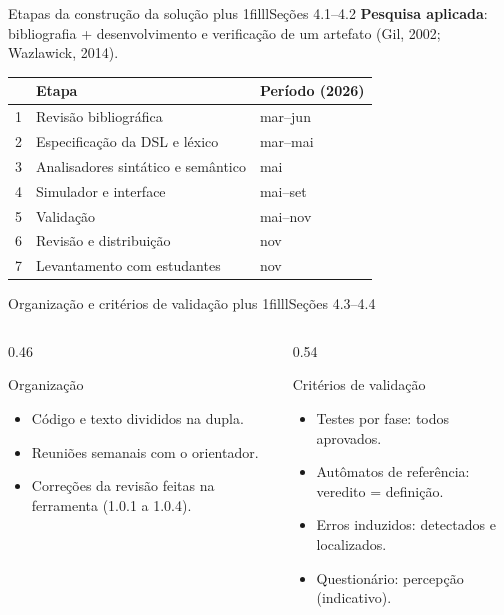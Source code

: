 \documentclass[aspectratio=169,12pt]{beamer}
\newcommand{\notexto}[1]{\hskip 0pt plus 1filll{\normalfont\small\color{white!85!acento}#1}}
\begin{document}
\begin{frame}{Etapas da construção da solução\notexto{Seções 4.1--4.2}}
  \textbf{Pesquisa aplicada}: bibliografia + desenvolvimento e verificação de um artefato
  (Gil, 2002; Wazlawick, 2014).
  \vspace{4pt}
  \begin{center}
    \renewcommand{\arraystretch}{1.05}
    \begin{tabular}{@{}rll@{}}
      \toprule
      & \textbf{Etapa} & \textbf{Período (2026)} \\
      \midrule
      1 & Revisão bibliográfica             & mar--jun \\
      2 & Especificação da DSL e léxico     & mar--mai \\
      3 & Analisadores sintático e semântico & mai \\
      4 & Simulador e interface             & mai--set \\
      5 & Validação                         & mai--nov \\
      6 & Revisão e distribuição            & nov \\
      7 & Levantamento com estudantes       & nov \\
      \bottomrule
    \end{tabular}
  \end{center}
\end{frame}

\begin{frame}{Organização e critérios de validação\notexto{Seções 4.3--4.4}}
  \begin{columns}[T]
    \begin{column}{0.46\textwidth}
      \begin{block}{Organização}
        \begin{itemize}
          \item Código e texto divididos na dupla.
          \item Reuniões semanais com o orientador.
          \item Correções da revisão feitas na ferramenta (1.0.1 a 1.0.4).
        \end{itemize}
      \end{block}
    \end{column}
    \begin{column}{0.54\textwidth}
      \begin{block}{Critérios de validação}
        \begin{itemize}
          \item Testes por fase: todos aprovados.
          \item Autômatos de referência: veredito = definição.
          \item Erros induzidos: detectados e localizados.
          \item Questionário: percepção (indicativo).
        \end{itemize}
      \end{block}
    \end{column}
  \end{columns}
\end{frame}
\end{document}
